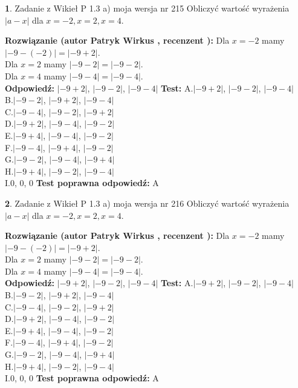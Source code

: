 \documentclass[12pt, a4paper]{article}
\theoremstyle{definition} %
\newtheorem{zad}{}
\newcommand{\zadStart}[1]{\begin{zad}#1\newline}
\newcommand{\zadStop}{\end{zad}}
\newcommand{\rozwStart}[2]{\noindent \textbf{Rozwiązanie (autor #1 , recenzent #2): }\newline}
\newcommand{\rozwStop}{\newline}
\newcommand{\odpStart}{\noindent \textbf{Odpowiedź:}\newline}
\newcommand{\odpStop}{\newline}
\newcommand{\testStart}{\noindent \textbf{Test:}\newline}
\newcommand{\testStop}{\newline}
\newcommand{\kluczStart}{\noindent \textbf{Test poprawna odpowiedź:}\newline}
\newcommand{\kluczStop}{\newline}
\begin{document}
\zadStart{Zadanie z Wikieł P 1.3 a) moja wersja nr 215}
Obliczyć wartość wyrażenia $|a - x|$ dla $x=-2,x=2,x=4$.
\zadStop
\rozwStart{Patryk Wirkus}{}
Dla $x = -2$ mamy $|-9 - (-2)| = |-9 + 2|$.\\
Dla $x = 2$ mamy $|-9 - 2| = |-9 - 2|$.\\
Dla $x = 4$ mamy $|-9 - 4| = |-9 - 4|$.\\
\rozwStop
\odpStart
$|-9 + 2|$, $|-9 - 2|$, $|-9 - 4|$
\odpStop
\testStart
A.$|-9 + 2|$, $|-9 - 2|$, $|-9 - 4|$\\
B.$|-9 - 2|$, $|-9 + 2|$, $|-9 - 4|$\\
C.$|-9 - 4|$, $|-9 - 2|$, $|-9 + 2|$\\
D.$|-9 + 2|$, $|-9 - 4|$, $|-9 - 2|$\\
E.$|-9 + 4|$, $|-9 - 4|$, $|-9 - 2|$\\
F.$|-9 - 4|$, $|-9 + 4|$, $|-9 - 2|$\\
G.$|-9 - 2|$, $|-9 - 4|$, $|-9 + 4|$\\
H.$|-9 + 4|$, $|-9 - 2|$, $|-9 - 4|$\\
I.$0$, $0$, $0$
\testStop
\kluczStart
A
\kluczStop



\zadStart{Zadanie z Wikieł P 1.3 a) moja wersja nr 216}
Obliczyć wartość wyrażenia $|a - x|$ dla $x=-2,x=2,x=4$.
\zadStop
\rozwStart{Patryk Wirkus}{}
Dla $x = -2$ mamy $|-9 - (-2)| = |-9 + 2|$.\\
Dla $x = 2$ mamy $|-9 - 2| = |-9 - 2|$.\\
Dla $x = 4$ mamy $|-9 - 4| = |-9 - 4|$.\\
\rozwStop
\odpStart
$|-9 + 2|$, $|-9 - 2|$, $|-9 - 4|$
\odpStop
\testStart
A.$|-9 + 2|$, $|-9 - 2|$, $|-9 - 4|$\\
B.$|-9 - 2|$, $|-9 + 2|$, $|-9 - 4|$\\
C.$|-9 - 4|$, $|-9 - 2|$, $|-9 + 2|$\\
D.$|-9 + 2|$, $|-9 - 4|$, $|-9 - 2|$\\
E.$|-9 + 4|$, $|-9 - 4|$, $|-9 - 2|$\\
F.$|-9 - 4|$, $|-9 + 4|$, $|-9 - 2|$\\
G.$|-9 - 2|$, $|-9 - 4|$, $|-9 + 4|$\\
H.$|-9 + 4|$, $|-9 - 2|$, $|-9 - 4|$\\
I.$0$, $0$, $0$
\testStop
\kluczStart
A
\kluczStop
\end{document}
